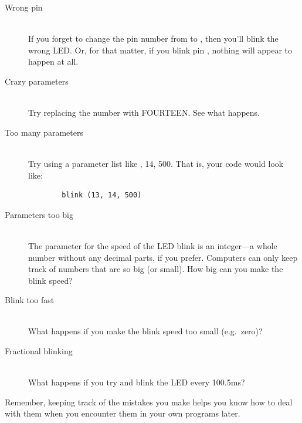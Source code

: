 \begin{description}
	\item[Wrong pin]\ \\
		If you forget to change the pin number from {} to {}, then you'll blink the wrong LED. Or, for that matter, if you blink pin {}, nothing will appear to happen at all.
	\item[Crazy parameters]\ \\
	Try replacing the number {} with {\code FOURTEEN}. See what happens. 
	\item[Too many parameters]\ \\
	Try using a parameter list like {, 14, 500}. That is, your code would look like:
	\begin{verbatim}
		blink (13, 14, 500)
	\end{verbatim}
	\item[Parameters too big]\ \\
	The parameter for the speed of the LED blink is an integer---a whole number without any decimal parts, if you prefer. Computers can only keep track of numbers that are so big (or small). How big can you make the blink speed? 
	\item[Blink too fast]\ \\
	What happens if you make the blink speed too small (e.g.~zero)?
	\item[Fractional blinking]\ \\
	What happens if you try and blink the LED every 100.5ms?
\end{description}

Remember, keeping track of the mistakes you make helps you know how to deal with them when you encounter them in your own programs later.


		



 



